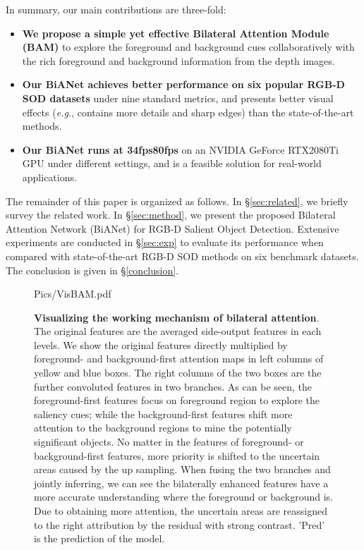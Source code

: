 \documentclass[journal]{IEEEtran}
\def\eg{\emph{e.g.}}
\begin{document}
In summary, our main contributions are three-fold:
\begin{itemize}
\item \textbf{We propose a simple yet effective Bilateral Attention Module (BAM)} to explore the foreground and background cues collaboratively with the rich foreground and background information from the depth images.\
\item \textbf{Our BiANet achieves better performance on six popular RGB-D SOD datasets} under nine standard metrics, and 
	presents better visual effects (\eg, contains more details and sharp edges) than the state-of-the-art methods.\
\item \textbf{Our BiANet runs at 34fps80fps} on an NVIDIA GeForce RTX2080Ti GPU under different settings, and is a feasible solution for real-world applications.
\end{itemize}

The remainder of this paper is organized as follows.
In \S\ref{sec:related}, we briefly survey the related work.
In \S\ref{sec:method}, we present the proposed Bilateral Attention Network (BiANet) for RGB-D Salient Object Detection.
Extensive experiments are conducted in \S\ref{sec:exp} to evaluate its performance when compared with state-of-the-art RGB-D SOD methods on six benchmark datasets.
The conclusion is given in \S\ref{conclusion}.

\begin{figure*}[t]
	\centering
	\begin{overpic}[width=.96\textwidth]{Pics/VisBAM.pdf}
	\end{overpic}
	\caption{\textbf{Visualizing the working mechanism of bilateral attention}.
		The original features are the averaged side-output features in each levels.
We show the original features directly multiplied by foreground- and background-first attention maps in left columns of yellow and blue boxes.
		The right columns of the two boxes are the further convoluted features in two branches.
		As can be seen, 
		the foreground-first features focus on foreground region to explore the saliency cues;
		while the background-first features shift more attention to the background regions to mine the potentially significant objects.
		No matter in the features of foreground- or background-first features, 
		more priority is shifted to the uncertain areas caused by the up sampling.
		When fusing the two branches and jointly inferring,
		we can see the bilaterally enhanced features have a more accurate understanding
		where the foreground or background is.
		Due to obtaining more attention, 
		the uncertain areas are reassigned to the right attribution by the residual with strong contrast.
		'Pred' is the prediction of the model.
	}
\label{fig:VisBAM}
\end{figure*}
\end{document}
